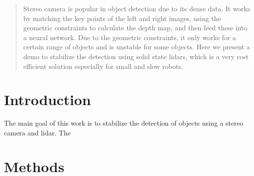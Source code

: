 \documentclass[balance,upint,subscriptcorrection,varvw,nofoot, mathalfa=cal=boondoxo,spanish,french,vietnamese,russian,greek,pdf-a,fontspec,colorlinks]{asmeconf}
\begin{document}




\begin{abstract}

Stereo camera is popular in object detection due to its dense data. It works by matching
the key points of the left and right images, using the geometric constraints to calculate
the depth map, and then feed these into a neural network. Due to the geometric
constraints, it only works for a certain range of objects and is unstable for some objects.
Here we present a demo to stabilize the detection using solid state lidars, which is a very
cost efficient solution especially for small and slow robots.
\end{abstract}






\section{Introduction}
The main goal of this work is to stabilize the detection of objects using a stereo camera and lidar. 
The 

\section{Methods}
\end{document}
